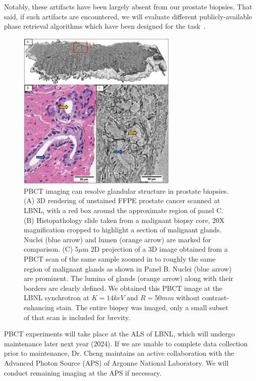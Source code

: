 \documentclass{NIHGrant}
\theoremstyle{theorem}
\begin{document}
Notably, these
artifacts have been largely absent from our prostate biopsies. That said, if
such artifacts are encountered, we will evaluate different publicly-available
phase retrieval algorithms which have been designed for the
task~\cite{mohan_non-linear_2023}.

\begin{figure}
  \vspace{-0.5cm} \includegraphics[width=0.69\textwidth]{ ./figures/figure1_v3.png }
  \caption{ PBCT imaging can resolve glandular structure in prostate biopsies.
    (A) 3D rendering of unstained FFPE prostate cancer scanned at LBNL, with a red box around the approximate region of panel C. (B) Histopathology slide taken from a malignant biopsy core, 20X
    magnification cropped to highlight a section of malignant glands. Nuclei
    (blue arrow) and lumen (orange arrow) are marked for comparison. (C) 5$\mu$m
    2D projection of a 3D image obtained from a PBCT scan of the same sample
    zoomed in to roughly the same region of malignant glands as shown in Panel
    B. Nuclei (blue arrow) are prominent. The lumina of glands (orange arrow)
    along with their borders are clearly defined. We obtained this PBCT image at
    the LBNL synchrotron at \(K=14keV\) and
    \(R=50mm\) without contrast-enhancing stain. The entire biopsy was
    imaged, only a small subset of that scan is included for
    brevity.}\label{fig:match_histo}
\end{figure}

PBCT experiments will take place at the ALS of LBNL, which will undergo maintenance later next year (2024). If we are unable to complete data collection prior to maintenance, Dr. Cheng maintains an active collaboration with the Advanced Photon Source (APS) of Argonne National Laboratory. We will conduct remaining imaging at the APS if necessary.
\end{document}
